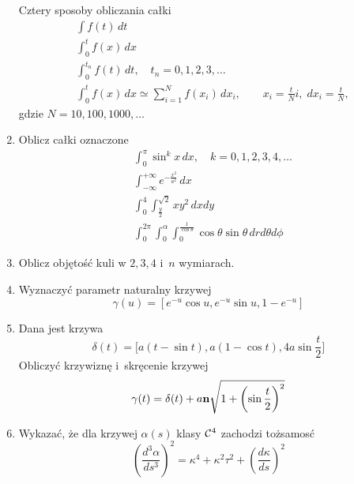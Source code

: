 \documentclass[a4paper,11pt]{article}
\begin{document}
\begin{enumerate}
  Cztery sposoby obliczania całki
  \begin{align}
    &\int f( t ) \, dt \\
    &\int_{ 0 }^{ t } f( x ) \, dx \\
    &\int_{ 0 }^{ t_{ n } } f( t ) \, dt, \quad
      t_{ n } = 0, 1, 2, 3, \ldots \\
    &\int_{ 0 }^{ t } f( x ) \, dx \simeq \sum_{ i = 1 }^{ N } f( x_{ i } ) \, dx_{ i },
      \qquad
      x_{ i } = \frac{ t }{ N } i,\; dx_{ i } = \frac{ t }{ N },
  \end{align}
  gdzie $N = 10, 100, 1000, \ldots$

\item Oblicz całki oznaczone
  \begin{align}
    &\int_{ 0 }^{ \pi } \sin^{ k } x \, dx, \quad
      k = 0, 1, 2, 3, 4, \ldots \\
    &\int_{ -\infty }^{ +\infty } e^{ -\frac{ x^{ 2 } }{ a^{ 2 } } } \, dx \\
    &\int_{ 0 }^{ 4 } \int_{ \frac{ y }{ 2 } }^{ \sqrt{ 2 } } x y^{ 2 } \, dx dy \\
    &\int_{ 0 }^{ 2\pi } \int_{ 0 }^{ \alpha } \int_{ 0 }^{ \frac{ 1 }{ \cos \theta } } \cos\theta \sin\theta \,
      dr d\theta d\phi
  \end{align}

\item Oblicz objętość kuli w $2, 3, 4$ i~$n$ wymiarach.

\item Wyznaczyć parametr naturalny krzywej
  \begin{equation}
    \label{eq:1}
    \gamma( u ) = \left[ e^{ -u } \cos u, e^{ -u } \sin u, 1 - e^{ -u } \right]
  \end{equation}

\item Dana jest krzywa
  \begin{equation}
    \label{eq:2}
    \delta( t )
    =
    \big[ a ( t - \sin t ), a ( 1 - \cos t ), 4a \sin \frac{ t }{ 2 } \big]
  \end{equation}
  Obliczyć krzywiznę i~skręcenie krzywej
  \begin{equation}
    \label{eq:3}
    \gamma( t )
    =
    \delta( t )
    + a \mathbf{n} \sqrt{ 1 + \left( \sin \frac{ t }{ 2 } \right)^{ 2 } }
  \end{equation}

\item Wykazać, że dla krzywej $\alpha( s )$ klasy $\mathcal{C}^{ 4 }$ zachodzi tożsamosć
  \begin{equation}
    \label{eq:4}
    \left( \frac{ d^{ 3 } \alpha }{ d s^{ 3 } } \right)^{ 2 }
    =
    \kappa^{ 4 } + \kappa^{ 2 } \tau^{ 2 } + \left( \frac{ d \kappa }{ d s } \right)^{ 2 }
  \end{equation}


\end{enumerate}
\end{document}

